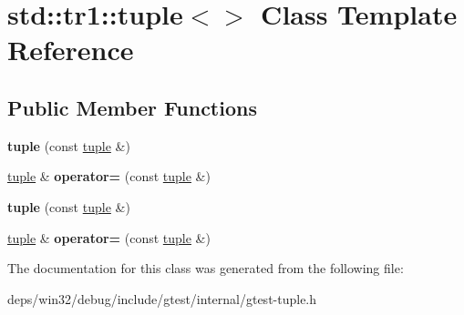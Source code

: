 \hypertarget{classstd_1_1tr1_1_1tuple_3_4}{}\section{std\+:\+:tr1\+:\+:tuple$<$$>$ Class Template Reference}
\label{classstd_1_1tr1_1_1tuple_3_4}
\subsection*{Public Member Functions}
\begin{DoxyCompactItemize}
\item 
\hypertarget{classstd_1_1tr1_1_1tuple_3_4_aa857599acb126134e29dc5e53fd9d1a7}{}{\bfseries tuple} (const \hyperlink{classstd_1_1tr1_1_1tuple}{tuple} \&)\label{classstd_1_1tr1_1_1tuple_3_4_aa857599acb126134e29dc5e53fd9d1a7}

\item 
\hypertarget{classstd_1_1tr1_1_1tuple_3_4_a93ddab6f662662fc49635608619150c8}{}\hyperlink{classstd_1_1tr1_1_1tuple}{tuple} \& {\bfseries operator=} (const \hyperlink{classstd_1_1tr1_1_1tuple}{tuple} \&)\label{classstd_1_1tr1_1_1tuple_3_4_a93ddab6f662662fc49635608619150c8}

\item 
\hypertarget{classstd_1_1tr1_1_1tuple_3_4_aa857599acb126134e29dc5e53fd9d1a7}{}{\bfseries tuple} (const \hyperlink{classstd_1_1tr1_1_1tuple}{tuple} \&)\label{classstd_1_1tr1_1_1tuple_3_4_aa857599acb126134e29dc5e53fd9d1a7}

\item 
\hypertarget{classstd_1_1tr1_1_1tuple_3_4_a93ddab6f662662fc49635608619150c8}{}\hyperlink{classstd_1_1tr1_1_1tuple}{tuple} \& {\bfseries operator=} (const \hyperlink{classstd_1_1tr1_1_1tuple}{tuple} \&)\label{classstd_1_1tr1_1_1tuple_3_4_a93ddab6f662662fc49635608619150c8}

\end{DoxyCompactItemize}


The documentation for this class was generated from the following file\+:\begin{DoxyCompactItemize}
\item 
deps/win32/debug/include/gtest/internal/gtest-\/tuple.\+h\end{DoxyCompactItemize}
